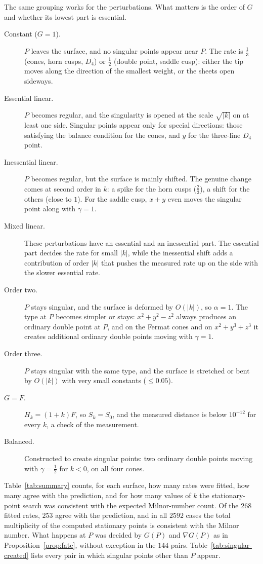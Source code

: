 \documentclass[12pt, a4paper, oneside]{book}
\theoremstyle{plain}
\theoremstyle{definition}
\theoremstyle{remark}
\theoremstyle{definition}
\begin{document}
The same grouping works for the perturbations. What matters is the order of $G$ and whether its lowest part is essential.
\begin{description}
    \item[Constant ($G=1$).] $P$ leaves the surface, and no singular points appear near $P$. The rate is $\tfrac13$ (cones, horn cusps, $D_4$) or $\tfrac12$ (double point, saddle cusp): either the tip moves along the direction of the smallest weight, or the sheets open sideways.
    \item[Essential linear.] $P$ becomes regular, and the singularity is opened at the scale $\sqrt{|k|}$ on at least one side. Singular points appear only for special directions: those satisfying the balance condition for the cones, and $y$ for the three-line $D_4$ point.
    \item[Inessential linear.] $P$ becomes regular, but the surface is mainly shifted. The genuine change comes at second order in $k$: a spike for the horn cusps ($\tfrac23$), a shift for the others (close to $1$). For the saddle cusp, $x+y$ even moves the singular point along with $\gamma=1$.
    \item[Mixed linear.] These perturbations have an essential and an inessential part. The essential part decides the rate for small $|k|$, while the inessential shift adds a contribution of order $|k|$ that pushes the measured rate up on the side with the slower essential rate.
    \item[Order two.] $P$ stays singular, and the surface is deformed by $O(|k|)$, so $\alpha=1$. The type at $P$ becomes simpler or stays: $x^2+y^2-z^2$ always produces an ordinary double point at $P$, and on the Fermat cones and on $x^2+y^3+z^3$ it creates additional ordinary double points moving with $\gamma=1$.
    \item[Order three.] $P$ stays singular with the same type, and the surface is stretched or bent by $O(|k|)$ with very small constants ($\le0.05$).
    \item[$G=F$.] $H_k=(1+k)F$, so $S_k=S_0$, and the measured distance is below $10^{-12}$ for every $k$, a check of the measurement.
    \item[Balanced.] Constructed to create singular points: two ordinary double points moving with $\gamma=\tfrac12$ for $k<0$, on all four cones.
\end{description}

Table~\ref{tab:summary} counts, for each surface, how many rates were fitted, how many agree with the prediction, and for how many values of $k$ the stationary-point search was consistent with the expected Milnor-number count. Of the $268$ fitted rates, $253$ agree with the prediction, and in all $2592$ cases the total multiplicity of the computed stationary points is consistent with the Milnor number. What happens at $P$ was decided by $G(P)$ and $\nabla G(P)$ as in Proposition~\ref{prop:fate}, without exception in the $144$ pairs. Table~\ref{tab:singular-created} lists every pair in which singular points other than $P$ appear.
\end{document}
